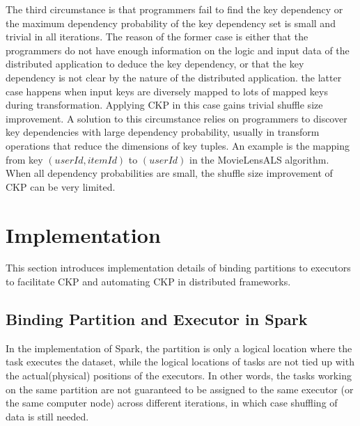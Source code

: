 \documentclass[10pt,journal,compsoc]{IEEEtran}
\begin{document}
The third circumstance is that programmers fail to find the key dependency 
or the maximum dependency probability of the key dependency set 
is small and trivial in all iterations. 
The reason of the former case is either that 
the programmers do not have enough information on the logic and input data of the distributed application to deduce the key dependency, 
or that the key dependency is not clear by the nature of the distributed application. 
the latter case happens when input keys are diversely mapped to lots of mapped
keys during transformation. 
Applying CKP in this case gains trivial shuffle size improvement. 
A solution to this circumstance relies on programmers to discover 
key dependencies with large dependency probability, 
usually in transform operations that reduce the dimensions of key tuples. 
An example is the mapping from key $(userId, itemId)$ to $(userId)$ in the 
MovieLensALS algorithm.
When all dependency probabilities are small, the shuffle size improvement 
of CKP can be very limited. 

\section{Implementation}\label{section:implement}
This section introduces implementation details of binding partitions to executors to facilitate CKP and automating CKP in distributed frameworks.



\subsection{Binding Partition and Executor in Spark}
In the implementation of Spark, the partition is only a logical location where the task executes the dataset, while the logical locations of tasks are not tied up with the actual(physical) positions of the executors. 
In other words, %
the tasks working on the same partition are not guaranteed to be assigned to the same executor (or the same computer node) across different iterations, in which case shuffling of data is still needed. 
\end{document}
